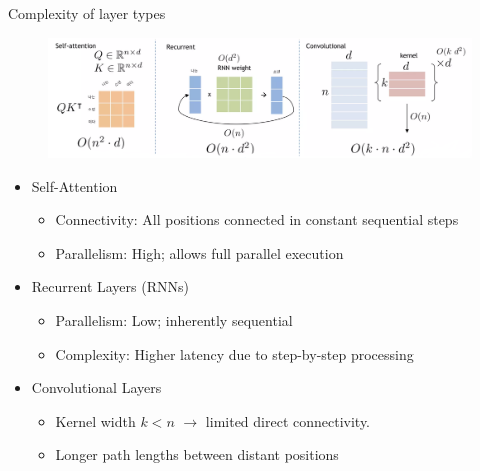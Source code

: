 \documentclass{beamer}
\begin{document}
\begin{frame}{Complexity of layer types}

\begin{figure}\renewcommand{\thefootnote}{}
    \centering
    \includegraphics[width=0.7\linewidth]{f20.png}
    \label{fig:enter-label}
\end{figure}

\vspace{-1em}
\begin{itemize}
    \item Self-Attention
        \begin{itemize}
        \item Connectivity: All positions connected in constant sequential steps
        \item Parallelism: High; allows full parallel execution
    \end{itemize}
    
    \item Recurrent Layers (RNNs)
        \begin{itemize}
        \item Parallelism: Low; inherently sequential
        \item Complexity: Higher latency due to step-by-step processing
    \end{itemize}

    \item Convolutional Layers
        \begin{itemize}
        \item Kernel width $k<n$ $\rightarrow$ limited direct connectivity.
        \item Longer path lengths between distant positions
    \end{itemize}
\end{itemize}    
\end{frame}
\end{document}
